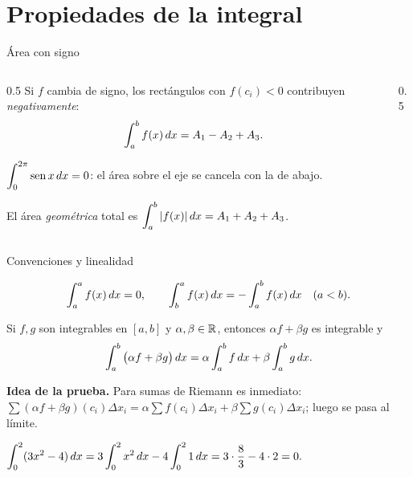 \documentclass[10pt,aspectratio=169]{beamer}
\begin{document}
\section{Propiedades de la integral}

\begin{frame}{Área con signo}
  \begin{columns}
    \begin{column}{0.5\textwidth}
      Si $f$ cambia de signo, los rectángulos con $f(c_i)<0$ contribuyen \emph{negativamente}:
      \[ \int_a^bf(x)\,dx=A_1-A_2+A_3. \]
      \begin{ejemplo}
        $\displaystyle\int_0^{2\pi}\operatorname{sen} x\,dx=0$: el área sobre el eje se cancela con la de abajo.
      \end{ejemplo}
      \begin{observacion}
        El área \emph{geométrica} total es $\displaystyle\int_a^b|f(x)|\,dx=A_1+A_2+A_3$.
      \end{observacion}
    \end{column}
    \begin{column}{0.5\textwidth}
      \centering
    \end{column}
  \end{columns}
\end{frame}

\begin{frame}{Convenciones y linealidad}
  \begin{definicion}[convenciones]
    \[ \int_a^af(x)\,dx=0,\qquad \int_b^af(x)\,dx=-\int_a^bf(x)\,dx\quad(a<b). \]
  \end{definicion}
  \begin{teorema}[Linealidad]
    Si $f,g$ son integrables en $[a,b]$ y $\alpha,\beta\in\mathbb{R}$, entonces $\alpha f+\beta g$ es integrable y
    \[ \int_a^b\big(\alpha f+\beta g\big)\,dx=\alpha\int_a^bf\,dx+\beta\int_a^bg\,dx. \]
  \end{teorema}
  \textbf{Idea de la prueba.} Para sumas de Riemann es inmediato:
  $\sum(\alpha f+\beta g)(c_i)\Delta x_i=\alpha\sum f(c_i)\Delta x_i+\beta\sum g(c_i)\Delta x_i$; luego se pasa al límite.
  \begin{ejemplo}
    $\displaystyle\int_0^2(3x^2-4)\,dx=3\int_0^2x^2\,dx-4\int_0^2 1\,dx=3\cdot\frac83-4\cdot2=0.$
  \end{ejemplo}
\end{frame}
\end{document}
